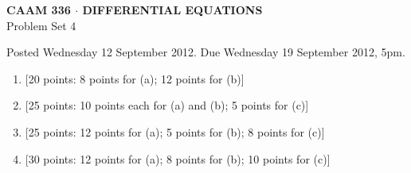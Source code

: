 \documentclass[10pt]{article}
\begin{document}
\begin{center}
\large \textsf{\textbf{CAAM 336 $\cdot$ DIFFERENTIAL EQUATIONS}\\[0.5em]
 Problem Set 4 }
\end{center}

Posted Wednesday 12 September 2012.  Due Wednesday 19 September 2012, 5pm.

\begin{enumerate}
\item {[20 points: 8 points for (a); 12 points for (b)]}\\  

\vspace*{2em}
\item {[25 points: 10 points each for (a) and (b); 5 points for (c)]}\\  

\vspace*{2em}
\item {[25 points: 12 points for (a); 5 points for (b); 8 points for (c)]}\\  

\vspace*{2em}
\item {[30 points: 12 points for (a); 8 points for (b); 10 points for (c)]}\\  
\end{enumerate}
\end{document}
